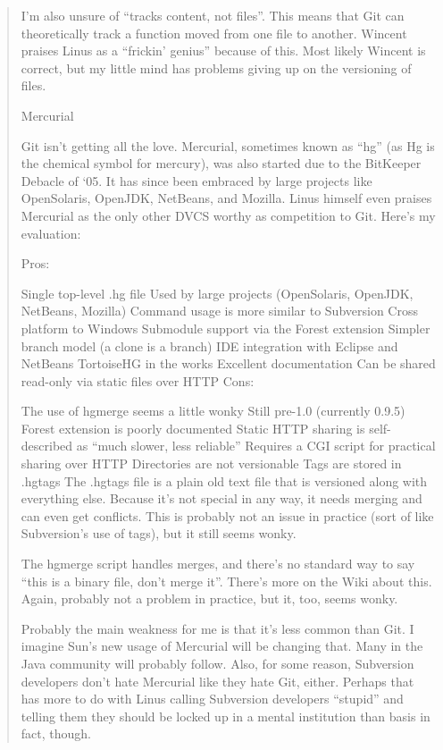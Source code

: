 \begin{enumerate}
\begin{quote}
            I’m also unsure of “tracks content, not files”. This means that Git can theoretically track a function moved from one file to another. Wincent praises Linus as a “frickin’ genius” because of this. Most likely Wincent is correct, but my little mind has problems giving up on the versioning of files.

            Mercurial

            Git isn’t getting all the love. Mercurial, sometimes known as “hg” (as Hg is the chemical symbol for mercury), was also started due to the BitKeeper Debacle of ‘05. It has since been embraced by large projects like OpenSolaris, OpenJDK, NetBeans, and Mozilla. Linus himself even praises Mercurial as the only other DVCS worthy as competition to Git. Here’s my evaluation:

            Pros:

            Single top-level .hg file
            Used by large projects (OpenSolaris, OpenJDK, NetBeans, Mozilla)
            Command usage is more similar to Subversion
            Cross platform to Windows
            Submodule support via the Forest extension
            Simpler branch model (a clone is a branch)
            IDE integration with Eclipse and NetBeans
            TortoiseHG in the works
            Excellent documentation
            Can be shared read-only via static files over HTTP
            Cons:

            The use of hgmerge seems a little wonky
            Still pre-1.0 (currently 0.9.5)
            Forest extension is poorly documented
            Static HTTP sharing is self-described as “much slower, less reliable”
            Requires a CGI script for practical sharing over HTTP
            Directories are not versionable
            Tags are stored in .hgtags
            The .hgtags file is a plain old text file that is versioned along with everything else. Because it’s not special in any way, it needs merging and can even get conflicts. This is probably not an issue in practice (sort of like Subversion’s use of tags), but it still seems wonky.

            The hgmerge script handles merges, and there’s no standard way to say “this is a binary file, don’t merge it”. There’s more on the Wiki about this. Again, probably not a problem in practice, but it, too, seems wonky.

            Probably the main weakness for me is that it’s less common than Git. I imagine Sun’s new usage of Mercurial will be changing that. Many in the Java community will probably follow. Also, for some reason, Subversion developers don’t hate Mercurial like they hate Git, either. Perhaps that has more to do with Linus calling Subversion developers “stupid” and telling them they should be locked up in a mental institution than basis in fact, though.


\end{quote}
\end{enumerate}
